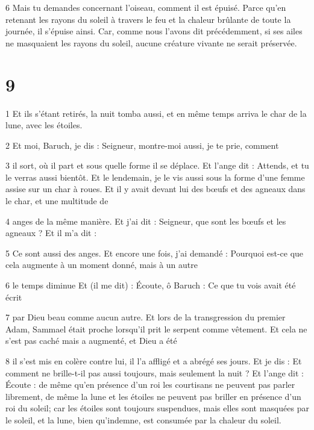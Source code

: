 \par 6 Mais tu demandes concernant l'oiseau, comment il est épuisé. Parce qu'en retenant les rayons du soleil à travers le feu et la chaleur brûlante de toute la journée, il s'épuise ainsi. Car, comme nous l'avons dit précédemment, si ses ailes ne masquaient les rayons du soleil, aucune créature vivante ne serait préservée.

\chapter{9}

\par 1 Et ils s'étant retirés, la nuit tomba aussi, et en même temps arriva le char de la lune, avec les étoiles.

\par 2 Et moi, Baruch, je dis : Seigneur, montre-moi aussi, je te prie, comment

\par 3 il sort, où il part et sous quelle forme il se déplace. Et l'ange dit : Attends, et tu le verras aussi bientôt. Et le lendemain, je le vis aussi sous la forme d'une femme assise sur un char à roues. Et il y avait devant lui des bœufs et des agneaux dans le char, et une multitude de

\par 4 anges de la même manière. Et j'ai dit : Seigneur, que sont les bœufs et les agneaux ? Et il m'a dit :

\par 5 Ce sont aussi des anges. Et encore une fois, j'ai demandé : Pourquoi est-ce que cela augmente à un moment donné, mais à un autre

\par 6 le temps diminue Et (il me dit) : Écoute, ô Baruch : Ce que tu vois avait été écrit

\par 7 par Dieu beau comme aucun autre. Et lors de la transgression du premier Adam, Sammael était proche lorsqu'il prit le serpent comme vêtement. Et cela ne s'est pas caché mais a augmenté, et Dieu a été

\par 8 il s'est mis en colère contre lui, il l'a affligé et a abrégé ses jours. Et je dis : Et comment ne brille-t-il pas aussi toujours, mais seulement la nuit ? Et l'ange dit : Écoute : de même qu'en présence d'un roi les courtisans ne peuvent pas parler librement, de même la lune et les étoiles ne peuvent pas briller en présence d'un roi du soleil; car les étoiles sont toujours suspendues, mais elles sont masquées par le soleil, et la lune, bien qu'indemne, est consumée par la chaleur du soleil.

